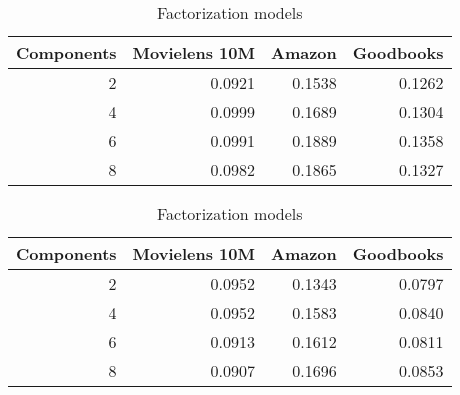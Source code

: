 \begin{table}
\caption{Effect of number of mixture components}
\label{tab:nummixtures}
\begin{subtable}{\columnwidth}
\caption{Sequence models}
\begin{tabular}{rrrr}
\toprule
   Components &   Movielens 10M &   Amazon &   Goodbooks \\
\midrule
            2 &          0.0921 &   0.1538 &      0.1262 \\
            4 &          0.0999 &   0.1689 &      0.1304 \\
            6 &          0.0991 &   0.1889 &      0.1358 \\
            8 &          0.0982 &   0.1865 &      0.1327 \\
\bottomrule
\end{tabular}
\end{subtable}
\begin{subtable}{\columnwidth}
\caption{Factorization models}
\begin{tabular}{rrrr}
\toprule
   Components &   Movielens 10M &   Amazon &   Goodbooks \\
\midrule
            2 &          0.0952 &   0.1343 &      0.0797 \\
            4 &          0.0952 &   0.1583 &      0.0840 \\
            6 &          0.0913 &   0.1612 &      0.0811 \\
            8 &          0.0907 &   0.1696 &      0.0853 \\
\bottomrule
\end{tabular}
\end{subtable}\end{table}